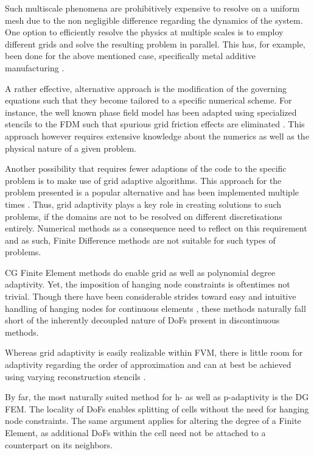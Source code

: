 \documentclass[sn-mathphys,Numbered]{sn-jnl}%
\theoremstyle{thmstyleone}%
\theoremstyle{thmstyletwo}%
\theoremstyle{thmstylethree}%
\begin{document}
Such multiscale phenomena are prohibitively expensive to resolve on a uniform mesh due to the non negligible difference regarding the dynamics of the system.
One option to efficiently resolve the physics at multiple scales is to employ different grids and solve the resulting problem in parallel.
This has, for example, been done for the above mentioned case, specifically metal additive manufacturing \cite{ghanbariAdaptiveLocalglobalMultiscale2020a}.

A rather effective, alternative approach is the modification of the governing equations such that they become tailored to a specific numerical scheme.
For instance, the well known phase field model has been adapted using specialized stencils to the FDM such that spurious grid friction effects are eliminated \cite{fleckSharpPhasefieldModeling2023,fleckFrictionlessMotionDiffuse2022}. 
This approach however requires extensive knowledge about the numerics as well as the physical nature of a given problem.

Another possibility that requires fewer adaptions of the code to the specific problem is to make use of grid adaptive algorithms.
This approach for the problem presented is a popular alternative and has been implemented multiple times \cite{proellHighlyEfficientComputational2023,olleakEnablingPartScaleScanwise2022,olleakPartscaleFiniteElement2020,olleakScanwiseAdaptiveRemeshing2020a}.
Thus, grid adaptivity plays a key role in creating solutions to such problems, if the domains are not to be resolved on different discretisations entirely.
Numerical methods as a consequence need to reflect on this requirement and as such, Finite Difference methods are not suitable for such types of problems.

CG Finite Element methods do enable grid as well as polynomial degree adaptivity.
Yet, the imposition of hanging node constraints is oftentimes not trivial.
Though there have been considerable strides toward easy and intuitive handling of hanging nodes for continuous elements \cite{solinArbitrarylevelHangingNodes2008,bangerthDataStructuresRequirements2009}, these methods naturally fall short of the inherently decoupled nature of DoFs present in discontinuous methods.

Whereas grid adaptivity is easily realizable within FVM, there is little room for adaptivity regarding the order of approximation and can at best be achieved using varying reconstruction stencils \cite{shuHighorderFiniteDifference2003}.

By far, the most naturally suited method for h- as well as p-adaptivity is the DG FEM.
The locality of DoFs enables splitting of cells without the need for hanging node constraints.
The same argument applies for altering the degree of a Finite Element, as additional DoFs within the cell need not be attached to a counterpart on its neighbors.
\end{document}
